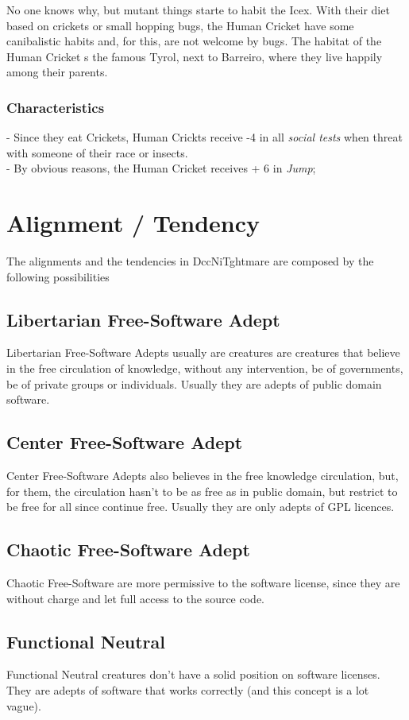 \documentclass[ letterpaper,12pt]{article}
\begin{document}
No one knows why, but mutant things starte to habit the Icex. With their diet based on crickets or small hopping bugs, the Human Cricket have some canibalistic habits and, for this, are not welcome by bugs. The habitat of the Human Cricket s the famous Tyrol, next to Barreiro, where they live happily among their parents.

\subsubsection{Characteristics}
- Since they eat Crickets, Human Crickts receive -4 in all {\it social tests} when threat with someone of their race or insects.\\
- By obvious reasons, the Human Cricket receives + 6 in {\it Jump};\\


\section{Alignment / Tendency}

The alignments and the tendencies in DccNiTghtmare are composed by the following possibilities\\
\subsection{Libertarian Free-Software Adept} Libertarian Free-Software Adepts usually are creatures are creatures that believe in the free circulation of knowledge, without any intervention, be of governments, be of private groups or individuals. Usually they are adepts of public domain software.
\subsection{Center Free-Software Adept} Center Free-Software Adepts also believes in the free knowledge circulation, but, for them, the circulation hasn't to be as free as in public domain, but restrict to be free for all since continue free. Usually they are only adepts of GPL licences.
\subsection{Chaotic Free-Software Adept} Chaotic Free-Software are more permissive to the software license, since they are without charge and let full access to the source code.
\subsection{Functional Neutral} Functional Neutral creatures don't have a solid position on software licenses. They are adepts of software that works correctly (and this concept is a lot vague).
\end{document}
